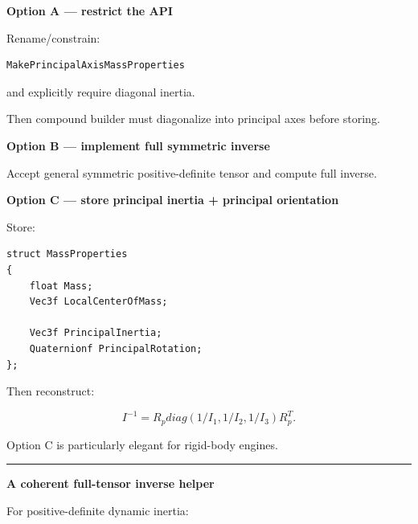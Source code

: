 \textbf{Option A --- restrict the API}

Rename/constrain:

\begin{verbatim}
MakePrincipalAxisMassProperties
\end{verbatim}

and explicitly require diagonal inertia.

Then compound builder must diagonalize into principal axes before storing.

\textbf{Option B --- implement full symmetric inverse}

Accept general symmetric positive-definite tensor and compute full inverse.

\textbf{Option C --- store principal inertia + principal orientation}

Store:

\begin{verbatim}
struct MassProperties
{
    float Mass;
    Vec3f LocalCenterOfMass;

    Vec3f PrincipalInertia;
    Quaternionf PrincipalRotation;
};
\end{verbatim}

Then reconstruct:

\[
I^{-1}
=
R_p
diag(
1/I_1,
1/I_2,
1/I_3)
R_p^T.
\]

Option C is particularly elegant for rigid-body engines.

\begin{center}\rule{0.5\linewidth}{0.5pt}\end{center}

\textbf{A coherent full-tensor inverse helper}

For positive-definite dynamic inertia:

